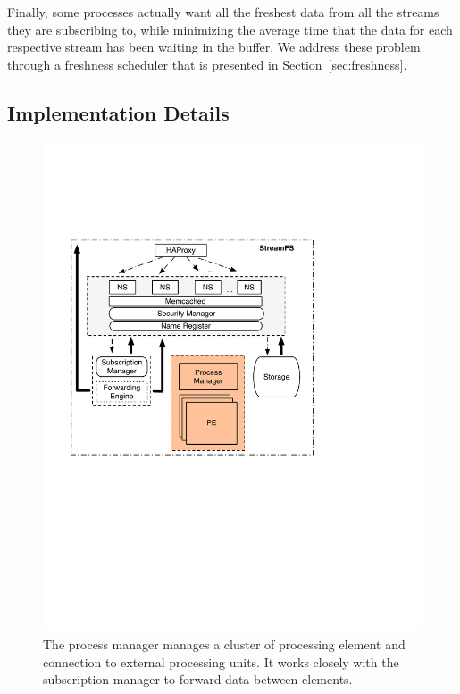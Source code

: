 
Finally, some processes actually want all the freshest
data from all the streams they are subscribing to, while minimizing the average time that the data for each respective stream has 
been waiting in the buffer.  We address these problem through a freshness scheduler that is presented in Section~\ref{sec:freshness}.



\subsection{Implementation Details}

\begin{figure}[h!] %
\centering
\includegraphics[width=.55\columnwidth]{figs/procmngr}
\caption{The process manager manages a cluster of processing element and connection to external processing units.  It works
closely with the subscription manager to forward data between elements.}
\label{fig:procmngr}
\end{figure}


